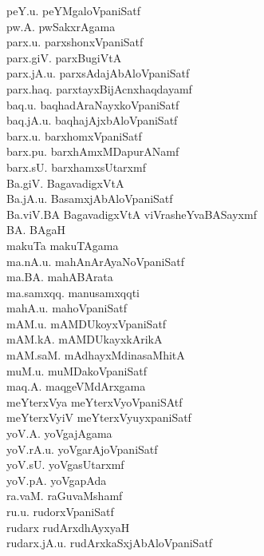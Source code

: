 {\begin{multicols}{2}
\begin{tabbing}
peY.u. \> peYMgaloVpaniSatf\\[2pt]
pw.A. \> pwSakxrAgama\\[2pt]
parx.u. \> parxshonxVpaniSatf\\[2pt]
parx.giV. \> parxBugiVtA\\[2pt]
parx.jA.u. \> parxsAdajAbAloVpaniSatf\\[2pt]
parx.haq. \> parxtayxBijAcnxhaqdayamf\\[2pt]
baq.u. \> baqhadAraNayxkoVpaniSatf\\[2pt]
baq.jA.u. \> baqhajAjxbAloVpaniSatf\\[2pt]
barx.u. \> barxhomxVpaniSatf\\[2pt]
barx.pu. \> barxhAmxMDapurANamf\\[2pt]
barx.sU. \> barxhamxsUtarxmf\\[2pt]
Ba.giV. \> BagavadigxVtA\\[2pt]
Ba.jA.u. \> BasamxjAbAloVpaniSatf\\[2pt]
Ba.viV.BA \> BagavadigxVtA viVrasheYvaBASayxmf\\[2pt]
BA. \> BAgaH\\[2pt]
makuTa \> makuTAgama\\[2pt]
ma.nA.u. \> mahAnArAyaNoVpaniSatf\\[2pt]
ma.BA. \> mahABArata\\[2pt]
ma.samxqq. \> manusamxqqti\\[2pt]
mahA.u. \> mahoVpaniSatf\\[2pt]
mAM.u. \> mAMDUkoyxVpaniSatf\\[2pt]
mAM.kA. \> mAMDUkayxkArikA\\[2pt]
mAM.saM. \> mAdhayxMdinasaMhitA\\[2pt]
muM.u. \> muMDakoVpaniSatf\\[2pt]
maq.A. \> maqgeVMdArxgama\\[2pt]
meYterxVya \> meYterxVyoVpaniSAtf\\[2pt]
meYterxVyiV \> meYterxVyuyxpaniSatf\\[2pt]
yoV.A. \> yoVgajAgama\\[2pt]
yoV.rA.u. \> yoVgarAjoVpaniSatf\\[2pt]
yoV.sU. \> yoVgasUtarxmf\\[2pt]
yoV.pA. \> yoVgapAda\\[2pt]
ra.vaM. \> raGuvaMshamf\\[2pt]
ru.u. \> rudorxVpaniSatf\\[2pt]
rudarx \> rudArxdhAyxyaH\\[2pt]
rudarx.jA.u. \> rudArxkaSxjAbAloVpaniSatf\\[2pt]

\end{tabbing}
\end{multicols}}

